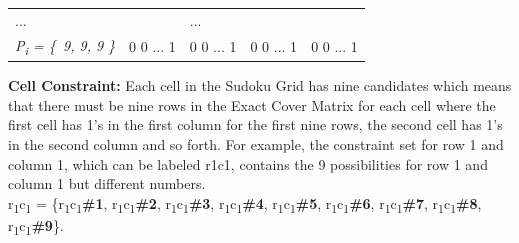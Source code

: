 \documentclass[a4paper,oneside,11pt]{report}
\begin{document}
\begin{tabular}{m{2.5cm} m{3cm} m{3cm} m{3cm} m{3cm}}
\hspace{0.7cm}... & &\hspace{2cm} ... & & \\
{\itshape P\textsubscript{i} = \{\ 9, 9, 9 \}} & 0\hspace{0.5cm} 0\hspace{0.5cm} ... \hspace{0.2cm} 1 & 0\hspace{0.5cm} 0\hspace{0.3cm} ... \hspace{0.5cm} 1 & 0\hspace{0.7cm} 0\hspace{0.5cm} ... \hspace{0.3cm} 1 & 0\hspace{0.7cm} 0\hspace{0.5cm} ... \hspace{0.3cm} 1\\ 
\end{tabular}
\newline
\newline

\textbf{Cell Constraint:} Each cell in the Sudoku Grid has nine candidates which means that there must be nine rows in the Exact Cover Matrix for each cell where the first cell has 1’s in the first column for the first nine rows, the second cell has 1’s in the second column and so forth.  For example, the constraint set for row 1 and column 1, which can be labeled r1c1, contains the 9 possibilities for row 1 and column 1 but different numbers.\\
r\textsubscript{1}c\textsubscript{1} = \{r\textsubscript{1}c\textsubscript{1}\textbf{\#1}, r\textsubscript{1}c\textsubscript{1}\textbf{\#2}, r\textsubscript{1}c\textsubscript{1}\textbf{\#3}, r\textsubscript{1}c\textsubscript{1}\textbf{\#4}, r\textsubscript{1}c\textsubscript{1}\textbf{\#5}, r\textsubscript{1}c\textsubscript{1}\textbf{\#6}, r\textsubscript{1}c\textsubscript{1}\textbf{\#7}, r\textsubscript{1}c\textsubscript{1}\textbf{\#8}, r\textsubscript{1}c\textsubscript{1}\textbf{\#9}\}.\\
\end{document}
